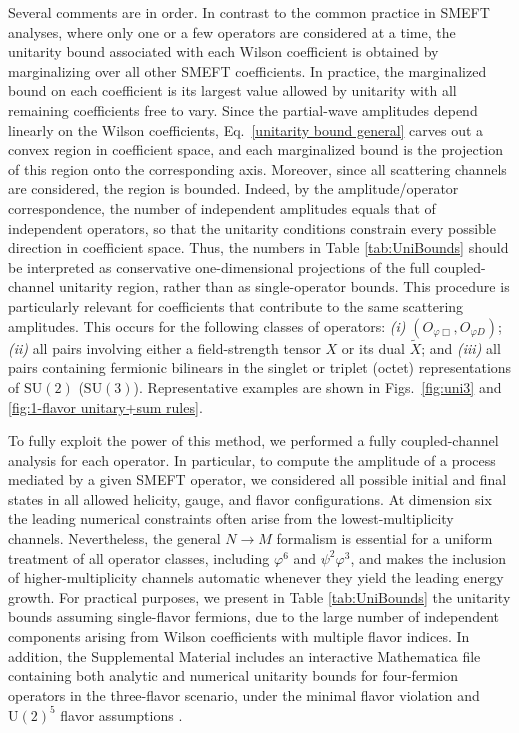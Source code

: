 \documentclass[
aps,
prd,
10pt,
twocolumn,
oneside,
preprintnumbers,
superscriptaddress,
amsmath,
amssymb,
nofootinbib,
flushbottom]{revtex4-2}
\begin{document}
Several comments are in order. 
In contrast to the common practice in SMEFT analyses, where only one or a few operators are considered at a time, the unitarity bound associated with each Wilson coefficient is obtained by marginalizing over all other SMEFT coefficients. 
In practice, the marginalized bound on each coefficient is its largest value allowed by unitarity with all remaining coefficients free to vary. Since the partial-wave amplitudes depend linearly on the Wilson coefficients,
Eq.~\eqref{unitarity bound general} carves out a convex region in coefficient space,
and each marginalized bound is the projection of this region onto the corresponding
axis. Moreover, since all scattering channels are considered, the region is bounded. Indeed, by the amplitude/operator correspondence, the number of independent amplitudes equals that of independent operators, so that the unitarity conditions constrain every possible direction in coefficient space. Thus, the numbers in Table \ref{tab:UniBounds} should be interpreted as conservative one-dimensional projections of the full coupled-channel unitarity region, rather than as single-operator bounds.
This procedure is particularly relevant for coefficients that contribute to the same scattering amplitudes. This occurs for the following classes of operators: \textit{(i)} $(O_{\varphi \Box}, O_{\varphi D})$; \textit{(ii)} all pairs involving either a field-strength tensor $X$ or its dual $\widetilde X$; and \textit{(iii)} all pairs containing fermionic bilinears in the singlet or triplet (octet) representations of $\mathrm{SU}(2)$ ($\mathrm{SU}(3)$). Representative examples are shown in Figs.~\ref{fig:uni3} and \ref{fig:1-flavor unitary+sum rules}.

%
To fully exploit the power of this method, we performed a fully coupled-channel analysis for each operator. In particular, to compute the amplitude of a process mediated by a given SMEFT operator, we considered all possible initial and final states in all allowed helicity, gauge, and flavor configurations. 
At dimension six the leading numerical constraints often arise from the lowest-multiplicity channels. Nevertheless, the general $N \to M$ formalism \cite{Bresciani:2025toe} is essential for a uniform treatment of all operator classes, including $\varphi^6$ and $\psi^2\varphi^3$, and makes the inclusion of higher-multiplicity channels automatic
whenever they yield the leading energy growth.
For practical purposes, we present in Table \ref{tab:UniBounds} the unitarity bounds assuming single-flavor fermions, due to the large number of independent components arising from Wilson coefficients with multiple flavor indices.
In addition, the Supplemental Material \cite{SupplementalMaterial} includes an interactive Mathematica file containing both analytic and numerical unitarity bounds for four-fermion operators in the three-flavor scenario, under the minimal flavor violation and $\mathrm{U}(2)^5$ flavor assumptions \cite{Faroughy:2020ina,Greljo:2022cah}.
\end{document}
